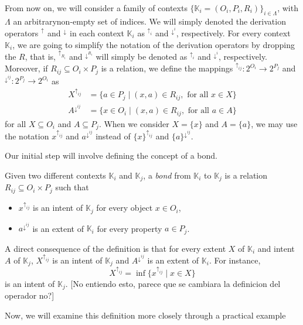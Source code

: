 \documentclass[runningheads,a4paper]{llncs}
\newcommand{\K}{\mathbb{K}}
\newcommand{\up}[1][]{{^{\uparrow_{#1}}}}
\newcommand{\down}[1][]{{^{\downarrow^{#1}}}}
\newcommand{\editornote}[1]{{\color{red}[#1]}}
\newcommand{\cred}[1]{{\color{red} #1}}
\newcommand{\cb}[1]{{\color{blue}#1}}
\newcommand{\ct}[1]{\cred{\textst{#1}}}
\begin{document}
\cb{From now on, we will consider} a family of contexts $\{\K_i = (O_i, P_i, R_i)\}_{i \in \Lambda}$, with $\Lambda$ an \cred{arbitrary}\cb{non-empty} set of indices. 
\cb{We will simply denoted the derivation operators $\up$ and $\down$ in each context $\K_i$ as $\up[i]$ and $\down[i]$, respectively.}
\cred{For every context $\K_i$, we are going to simplify the notation of the derivation operators by dropping the $R$, that is, $\up[R_i]$ and $\down[R_i]$ will simply be denoted as $\up[i]$ and $\down[i]$, respectively. }
Moreover, if $R_{ij} \subseteq O_i \times P_j$ is a relation, we \ct{will} define the mappings $\up[ij] \colon 2^{O_i} \to 2^{P_j}$ and $\down[ij] \colon 2^{P_j} \to 2^{O_i}$ as
\begin{align*}
	X\up[ij] &= \{a \in P_j \mid (x, a) \in R_{ij}, \text{ for all $x \in X$}\} \\
	A\down[ij] &= \{x \in O_i \mid (x, a) \in R_{ij}, \text{ for all $a \in A$}\}
\end{align*}
for all $X \subseteq O_i$ and $A \subseteq P_j$. When we consider $X = \{x\}$ and $A = \{a\}$, we may use the notation $x\up[ij]$ and $a\down[ij]$ instead of $\{x\}\up[ij]$ and $\{a\}\down[ij]$.

Our initial step will involve defining the concept of a bond.

\begin{definition}\label{def:bond}

Given two different contexts $\K_i$ and $\K_j$, a \emph{bond} from $\K_i$ to $\K_j$ is a relation $R_{ij} \subseteq O_i \times P_j$ such that
\begin{itemize}
	\item $x\up[ij]$ is an intent of $\K_j$ for every object $x \in O_i$,
	\item $a\down[ij]$ is an extent of $\K_i$ for every property $a \in P_j$.
\end{itemize}

\end{definition}

A direct consequence of the definition is that for every extent $X$ of $\K_i$ and intent $A$ of $\K_j$, $X\up[ij]$ is an intent of $\K_j$ and $A\down[ij]$ is an extent of $\K_i$. \cred{For instance,
\[
X\up[ij] = \inf \{x\up[ij] \mid x \in X\}
\]
is an intent of $\K_j$.} \editornote{No entiendo esto, parece que se cambiara la definicion del operador no?}

\cb{Now, we will}\ct{Let's} examine this definition more closely through a practical example
\end{document}
